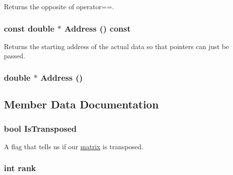 Returns the opposite of operator==. \hypertarget{classJKBuilder_1_1tensor_a6a4e024f566d3bf9ba32a349afc5bbcf}{
\subsubsection[{Address}]{\setlength{\rightskip}{0pt plus 5cm}const double $\ast$ Address () const}}
\label{classJKBuilder_1_1tensor_a6a4e024f566d3bf9ba32a349afc5bbcf}


Returns the starting address of the actual data so that pointers can just be passed. \hypertarget{classJKBuilder_1_1tensor_ac982d9eb84092bfc13694448dd824cbc}{
\subsubsection[{Address}]{\setlength{\rightskip}{0pt plus 5cm}double $\ast$ Address ()}}
\label{classJKBuilder_1_1tensor_ac982d9eb84092bfc13694448dd824cbc}


\subsection{Member Data Documentation}
\hypertarget{classJKBuilder_1_1matrix_a77fa48e57c519482de2ec7ec182b16ef}{
\subsubsection[{IsTransposed}]{\setlength{\rightskip}{0pt plus 5cm}bool {\bf IsTransposed}}}
\label{classJKBuilder_1_1matrix_a77fa48e57c519482de2ec7ec182b16ef}


A flag that tells us if our \hyperlink{classJKBuilder_1_1matrix}{matrix} is transposed. \hypertarget{classJKBuilder_1_1tensor_a6cfd95afd0afebd625b889fb6e58371c}{
\subsubsection[{rank}]{\setlength{\rightskip}{0pt plus 5cm}int {\bf rank}}}
\label{classJKBuilder_1_1tensor_a6cfd95afd0afebd625b889fb6e58371c}


